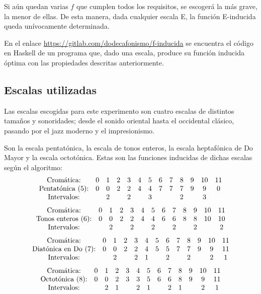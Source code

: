 		Si aún quedan varias $f$ que cumplen todos los requisitos, se escogerá la más grave, la menor de ellas. De esta manera, dada cualquier escala E, la función E-inducida queda unívocamente determinada.
		
		En el enlace \url{https://gitlab.com/dodecafonismo/f-inducida} se encuentra el código en Haskell de un programa que, dado una escala, produce su función inducida óptima con las propiedades descritas anteriormente.
		
		\subsection{Escalas utilizadas}
		
		Las escalas escogidas para este experimento son cuatro escalas de distintos tamaños y sonoridades; desde el sonido oriental hasta el occidental clásico, pasando por el jazz moderno y el impresionismo.
		
		Son la escala pentatónica, la escala de tonos enteros, la escala heptafónica de Do Mayor y la escala octotónica. Estas son las funciones inducidas de dichas escalas según el algoritmo:
		\[\left.\begin{array}{*{13}c}
		\text{Cromática:}&0&1&2&3&4&5&6&7&8&9&10&11\\
		\text{Pentatónica (5):}&0&0&2&2&4&4&7&7&7&9&9&0\\
		\text{Intervalos:}&&2&&2&&3&&&2&&3&\\
		\end{array}\right.\]		
		\[\left.\begin{array}{*{13}c}
		\text{Cromática:}&0&1&2&3&4&5&6&7&8&9&10&11\\
		\text{Tonos enteros (6):}&0&0&2&2&4&4&6&6&8&8&10&10\\
		\text{Intervalos:}&&2&&2&&2&&2&&2&&2\\
		\end{array}\right.\]
		\[\left.\begin{array}{*{13}c}
		\text{Cromática:}&0&1&2&3&4&5&6&7&8&9&10&11\\
		\text{Diatónica en Do (7):}&0&0&2&2&4&5&5&7&7&9&9&11\\
		\text{Intervalos:}&&2&&2&1&&2&&2&&2&1\\
		\end{array}\right.\]        
		\[\left.\begin{array}{*{13}c}
		\text{Cromática:}&0&1&2&3&4&5&6&7&8&9&10&11\\
		\text{Octotónica (8):}&0&0&2&3&3&5&6&6&8&9&9&11\\
		\text{Intervalos:}&&2&1&&2&1&&2&1&&2&1\\
		\end{array}\right.\]